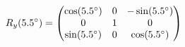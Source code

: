\documentclass[preview]{standalone}
\begin{document}
\begin{align*}
\special{dvisvgm:raw <g id='unique000'>}R_y(5.5^\circ) = \begin{pmatrix} \cos(5.5^\circ) & 0 & -\sin(5.5^\circ) \\ 0 & 1 & 0 \\ \sin(5.5^\circ) & 0 & \cos(5.5^\circ) \end{pmatrix}\special{dvisvgm:raw </g>}
\end{align*}
\end{document}
